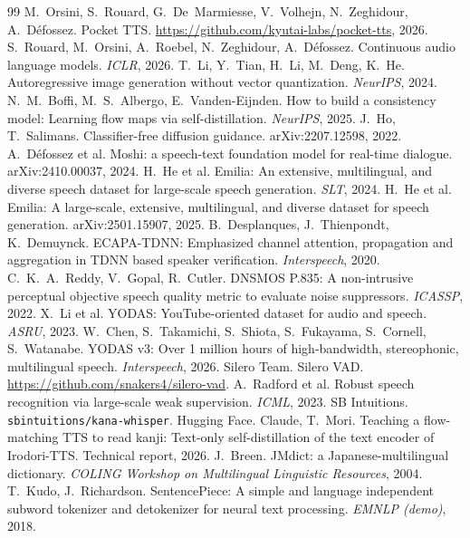 \documentclass[10pt,a4paper,twocolumn]{article}
\begin{document}
\begin{thebibliography}{99}\footnotesize
\setlength{\itemsep}{0pt}
 M.~Orsini, S.~Rouard, G.~De~Marmiesse, V.~Volhejn, N.~Zeghidour, A.~Défossez.
Pocket TTS. \url{https://github.com/kyutai-labs/pocket-tts}, 2026.
 S.~Rouard, M.~Orsini, A.~Roebel, N.~Zeghidour, A.~Défossez. Continuous audio
language models. \emph{ICLR}, 2026.
 T.~Li, Y.~Tian, H.~Li, M.~Deng, K.~He. Autoregressive image generation without vector
quantization. \emph{NeurIPS}, 2024.
 N.~M.~Boffi, M.~S.~Albergo, E.~Vanden-Eijnden. How to build a consistency model:
Learning flow maps via self-distillation. \emph{NeurIPS}, 2025.
 J.~Ho, T.~Salimans. Classifier-free diffusion guidance. arXiv:2207.12598, 2022.
 A.~Défossez et al. Moshi: a speech-text foundation model for real-time dialogue.
arXiv:2410.00037, 2024.
 H.~He et al. Emilia: An extensive, multilingual, and diverse speech dataset for
large-scale speech generation. \emph{SLT}, 2024.
 H.~He et al. Emilia: A large-scale, extensive, multilingual, and diverse
dataset for speech generation. arXiv:2501.15907, 2025.
 B.~Desplanques, J.~Thienpondt, K.~Demuynck. ECAPA-TDNN: Emphasized channel
attention, propagation and aggregation in TDNN based speaker verification. \emph{Interspeech}, 2020.
 C.~K.~A.~Reddy, V.~Gopal, R.~Cutler. DNSMOS P.835: A non-intrusive perceptual
objective speech quality metric to evaluate noise suppressors. \emph{ICASSP}, 2022.
 X.~Li et al. YODAS: YouTube-oriented dataset for audio and speech. \emph{ASRU}, 2023.
 W.~Chen, S.~Takamichi, S.~Shiota, S.~Fukayama, S.~Cornell, S.~Watanabe. YODAS v3:
Over 1 million hours of high-bandwidth, stereophonic, multilingual speech. \emph{Interspeech}, 2026.
 Silero Team. Silero VAD. \url{https://github.com/snakers4/silero-vad}.
 A.~Radford et al. Robust speech recognition via large-scale weak supervision.
\emph{ICML}, 2023.
 SB Intuitions. \texttt{sbintuitions/kana-whisper}. Hugging Face.
 Claude, T.~Mori. Teaching a flow-matching TTS to read kanji: Text-only
self-distillation of the text encoder of Irodori-TTS. Technical report, 2026.
 J.~Breen. JMdict: a Japanese-multilingual dictionary. \emph{COLING Workshop on
Multilingual Linguistic Resources}, 2004.
 T.~Kudo, J.~Richardson. SentencePiece: A simple and language independent
subword tokenizer and detokenizer for neural text processing. \emph{EMNLP (demo)}, 2018.

\end{thebibliography}
\end{document}

